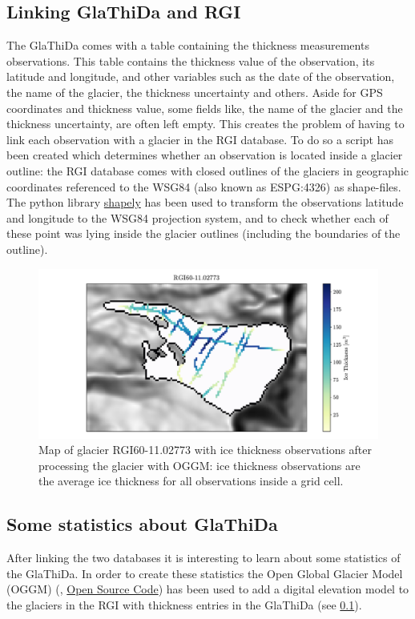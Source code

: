 \subsection{Linking GlaThiDa and RGI}\label{GlaRGI}
The GlaThiDa comes with a table containing the thickness measurements observations. This table contains the thickness value of the observation, its latitude and longitude, and other variables such as the date of the observation, the name of the glacier, the thickness uncertainty and others. Aside for GPS coordinates and thickness value, some fields like, the name of the glacier and the thickness uncertainty, are often left empty. This creates the problem of having to link each observation with a glacier in the RGI database. To do so a script has been created which determines whether an observation is located inside a glacier outline: the RGI database comes with closed outlines of the glaciers in geographic coordinates referenced to the WSG84 (also known as ESPG:4326) as shape-files. The python library \href{https://github.com/Toblerity/Shapely}{shapely} has been used to transform the observations latitude and longitude to the WSG84 projection system, and to check whether each of these point was lying inside the glacier outlines (including the boundaries of the outline).

\begin{figure}\label{fig:thickness-pt} 
	\centering 
	\includegraphics[width=1.0\textwidth]{./figures/glathida_thick_map.pdf}
	\caption{Map of glacier RGI60-11.02773 with ice thickness observations after processing the glacier with OGGM: ice thickness observations are the average ice thickness for all observations inside a grid cell.}
\end{figure}

\subsection{Some statistics about GlaThiDa}
After linking the two databases it is interesting to learn about some statistics of the GlaThiDa. In order to create these statistics the Open Global Glacier Model (OGGM) (\citet{OGGM2019}, \href{https://github.com/OGGM/oggm}{Open Source Code}) has been used to add a digital elevation model to the glaciers in the RGI with thickness entries in the GlaThiDa (see \ref{GlaRGI}).

